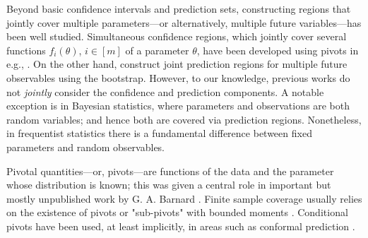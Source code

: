 \documentclass[english]{article}
\begin{document}




Beyond basic confidence intervals and prediction sets,
constructing regions that jointly cover multiple parameters---or alternatively, multiple future variables---has been well studied.
Simultaneous confidence regions, which jointly cover several functions $f_i(\theta)$, $i \in [m]$ of a parameter $\theta$, have been developed using pivots in e.g., \cite{scheffe1953method,scheffe1999analysis}.
On the other hand,
\cite{wolf2015bootstrap} 
construct joint prediction regions for multiple future observables using the bootstrap. 
However, to our knowledge, previous works do not \emph{jointly} consider the confidence and prediction components.
A notable exception is in Bayesian statistics, where parameters and observations are both random variables; and hence both are covered via prediction regions.
Nonetheless, in frequentist statistics there is a fundamental difference between fixed parameters and random observables. 


Pivotal quantities---or, pivots---are  functions of the data and the parameter whose distribution is known; 
this was given a central role in important but mostly unpublished work by G. A. Barnard \citep[][p. 29]{cox2006principles}. 
Finite sample coverage usually relies on the existence of pivots 
\cite[e.g.,][etc]{fraser1966structural,fraser1968structure,fraser1971events,cox1979theoretical,brenner1983models,barnard1995pivotal,fraser1996some}
or "sub-pivots" with bounded moments \citep{wasserman2020universal}.
Conditional pivots have been used, at least implicitly, in areas such as conformal prediction \protect\citep[e.g.,][]{vovk1999machine,vovk2022algorithmic,Lei2014,lei2013distribution,lei2018distribution,romano2019malice,romano2019conformalized,xu2021conformal}.
\end{document}
